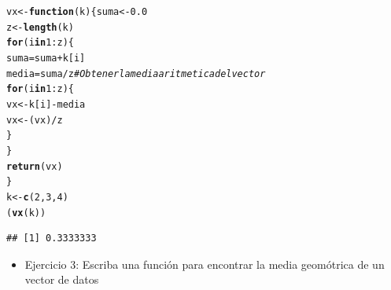 \documentclass[12pt,letterpaper]{article}\usepackage[]{graphicx}\usepackage[]{color}
\makeatletter
\newcommand{\hlnum}[1]{\textcolor[rgb]{0.686,0.059,0.569}{#1}}%
\newcommand{\hlcom}[1]{\textcolor[rgb]{0.678,0.584,0.686}{\textit{#1}}}%
\newcommand{\hlopt}[1]{\textcolor[rgb]{0,0,0}{#1}}%
\newcommand{\hlstd}[1]{\textcolor[rgb]{0.345,0.345,0.345}{#1}}%
\newcommand{\hlkwa}[1]{\textcolor[rgb]{0.161,0.373,0.58}{\textbf{#1}}}%
\newcommand{\hlkwb}[1]{\textcolor[rgb]{0.69,0.353,0.396}{#1}}%
\newcommand{\hlkwc}[1]{\textcolor[rgb]{0.333,0.667,0.333}{#1}}%
\newcommand{\hlkwd}[1]{\textcolor[rgb]{0.737,0.353,0.396}{\textbf{#1}}}%
\newenvironment{kframe}{%
 \def\at@end@of@kframe{}%
 \ifinner\ifhmode%
  \def\at@end@of@kframe{\end{minipage}}%
  \begin{minipage}{\columnwidth}%
 \fi\fi%
 \def\FrameCommand##1{\hskip\@totalleftmargin \hskip-\fboxsep
 \colorbox{shadecolor}{##1}\hskip-\fboxsep
     \hskip-\linewidth \hskip-\@totalleftmargin \hskip\columnwidth}%
 \MakeFramed {\advance\hsize-\width
   \@totalleftmargin\z@ \linewidth\hsize
   \@setminipage}}%
 {\par\unskip\endMakeFramed%
 \at@end@of@kframe}
\newenvironment{knitrout}{}{} %
\makeatother
\begin{document}
\begin{knitrout}
\color{fgcolor}\begin{kframe}
\begin{alltt}
\hlstd{vx}\hlkwb{<-}\hlkwa{function}\hlstd{(}\hlkwc{k}\hlstd{) \{ suma} \hlkwb{<-} \hlnum{0.0}
  \hlstd{z}\hlkwb{<-}\hlkwd{length}\hlstd{(k)}
  \hlkwa{for}\hlstd{(i} \hlkwa{in} \hlnum{1}\hlopt{:}\hlstd{z)\{}
    \hlstd{suma} \hlkwb{=} \hlstd{suma} \hlopt{+} \hlstd{k[i]}
    \hlstd{media} \hlkwb{=} \hlstd{suma}\hlopt{/}\hlstd{z} \hlcom{# Obtener la media aritmetica del vector}
    \hlkwa{for}\hlstd{(i} \hlkwa{in} \hlnum{1}\hlopt{:}\hlstd{z)\{}
      \hlstd{vx}\hlkwb{<-}\hlstd{k[i]}\hlopt{-}\hlstd{media}
      \hlstd{vx}\hlkwb{<-}\hlstd{(vx)}\hlopt{/}\hlstd{z}
    \hlstd{\}}
  \hlstd{\}}
  \hlkwd{return}\hlstd{(vx)}
\hlstd{\}}
\hlstd{k} \hlkwb{<-} \hlkwd{c}\hlstd{(}\hlnum{2}\hlstd{,}\hlnum{3}\hlstd{,}\hlnum{4}\hlstd{)}
\hlstd{(}\hlkwd{vx}\hlstd{(k))}
\end{alltt}
\begin{verbatim}
## [1] 0.3333333
\end{verbatim}
\end{kframe}
\end{knitrout}
\begin{itemize}
\item Ejercicio 3: Escriba una funci\'on para encontrar la media geom\'otrica de un vector de datos
\end{itemize}
\end{document}
